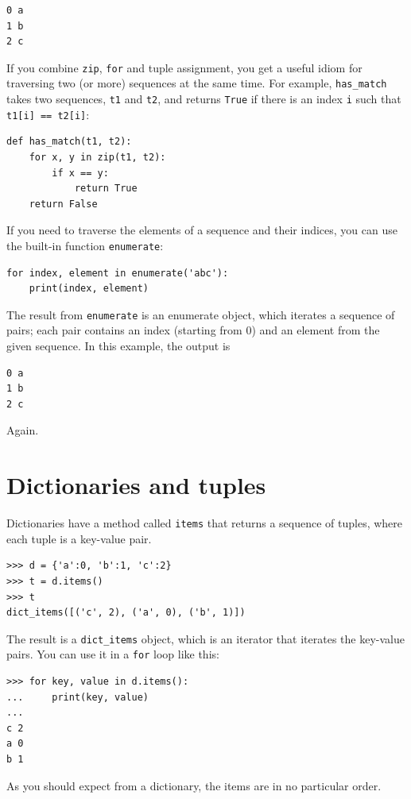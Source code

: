 \documentclass[10pt]{book}
\begin{document}
\begin{verbatim}
0 a
1 b
2 c
\end{verbatim}
%
If you combine {\tt zip}, {\tt for} and tuple assignment, you get a
useful idiom for traversing two (or more) sequences at the same
time.  For example, \verb"has_match" takes two sequences, {\tt t1} and
{\tt t2}, and returns {\tt True} if there is an index {\tt i}
such that {\tt t1[i] == t2[i]}:

\begin{verbatim}
def has_match(t1, t2):
    for x, y in zip(t1, t2):
        if x == y:
            return True
    return False
\end{verbatim}
%
If you need to traverse the elements of a sequence and their
indices, you can use the built-in function {\tt enumerate}:

\begin{verbatim}
for index, element in enumerate('abc'):
    print(index, element)
\end{verbatim}
%
The result from {\tt enumerate} is an enumerate object, which
iterates a sequence of pairs; each pair contains an index (starting
from 0) and an element from the given sequence.
In this example, the output is

\begin{verbatim}
0 a
1 b
2 c
\end{verbatim}
%
Again.


\section{Dictionaries and tuples}
\label{dictuple}

Dictionaries have a method called {\tt items} that returns a sequence of
tuples, where each tuple is a key-value pair.

\begin{verbatim}
>>> d = {'a':0, 'b':1, 'c':2}
>>> t = d.items()
>>> t
dict_items([('c', 2), ('a', 0), ('b', 1)])
\end{verbatim}
%
The result is a \verb"dict_items" object, which is an iterator that
iterates the key-value pairs.  You can use it in a {\tt for} loop
like this:

\begin{verbatim}
>>> for key, value in d.items():
...     print(key, value)
...
c 2
a 0
b 1
\end{verbatim}
%
As you should expect from a dictionary, the items are in no
particular order.
\end{document}
